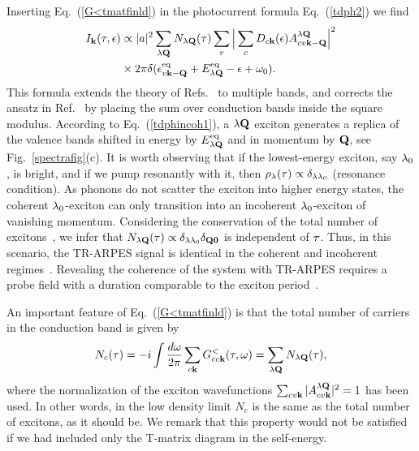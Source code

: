 \documentclass[twocolumn,aps,a4paper,superscriptaddress]{revtex4-2}
\begin{document}
Inserting Eq.~(\ref{G<tmatfinld}) in the photocurrent formula
Eq.~(\ref{tdph2}) we find
\begin{align}
I_{{\mathbf k}}(\tau,\epsilon)&\propto |a|^{2}\sum_{\lambda{\mathbf Q}}N_{\lambda{\mathbf Q}}(\tau)\sum_{v}
\Big|\sum_{c}D_{c{\mathbf k}}(\epsilon)A^{\lambda{\mathbf Q}}_{cv{\mathbf k}-{\mathbf Q}}\Big|^{2}
\nonumber\\
&\times 2\pi\delta(\epsilon^{\rm eq}_{v{\mathbf k}-{\mathbf Q}}+E^{\rm eq}_{\lambda{\mathbf Q}}-\epsilon+\omega_{0}).
\label{tdphincoh1}
\end{align}
This formula extends the theory of
Refs.~\cite{perfetto_first-principles_2016,rustagi_photoemission_2018}
to multiple bands, and corrects the ansatz in
Ref.~\cite{chen_first-principles_2022} by placing the sum over
conduction bands inside the square modulus.
According to Eq.~(\ref{tdphincoh1}), a $\lambda{\mathbf Q}$ exciton generates a
replica of the valence bands shifted in energy by $E^{\rm eq}_{\lambda{\mathbf Q}}$
and in momentum by ${\mathbf Q}$, see Fig.~\ref{spectrafig}(c).
It is worth observing that if the lowest-energy exciton, say $\lambda_{0}$,
is bright, and if we pump resonantly with it, then
$\rho_{\lambda}(\tau)\propto \delta_{\lambda\lambda_{0}}$ (resonance condition).
As phonons do not scatter the exciton into higher energy states, the
coherent $\lambda_{0}$-exciton can only transition into an incoherent
$\lambda_{0}$-exciton of vanishing momentum. Considering the conservation of the total number of
excitons~\cite{stefanucci_excitonic_2025}, we infer that
$N_{\lambda{\mathbf Q}}(\tau)\propto \delta_{\lambda\lambda_{0}}\delta_{{\mathbf Q}\mathbf 0}$ is  independent of $\tau$.
Thus, in this scenario, the TR-ARPES signal is identical
in the coherent and incoherent
regimes~\cite{notepolaronic}.
Revealing the coherence of the system with TR-ARPES
requires a
probe field with a duration comparable to the exciton
period~\cite{perfetto_time-resolved_2020}.

An important feature of Eq.~(\ref{G<tmatfinld}) is that the total
number of carriers in the conduction band is given by
\begin{align}
N_{c}(\tau)=-i\int\frac{d\omega}{2\pi}\sum_{c{\mathbf k}}G^{<}_{cc{\mathbf k}}(\tau,\omega)=
\sum_{\lambda{\mathbf Q}}N_{\lambda{\mathbf Q}}(\tau),
\label{nc=nx}
\end{align}
where the normalization of the exciton wavefunctions
$\sum_{cv{\mathbf k}}|A^{\lambda{\mathbf Q}}_{cv{\mathbf k}}|^{2}=1$ has been used.
In other words, in the low density limit $N_{c}$ is the same as the
total number of excitons, as it should be.
We remark that this property would not be satisfied if we  had
included only the T-matrix diagram in the self-energy.
\end{document}
